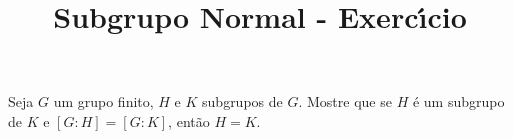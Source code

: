 \documentclass{beamer}
\title{Subgrupo Normal - Exerc{\'\i}cio}
\author[\autor]{\autor}
\institute[\instituto]{\instituto}
\begin{document}


    \begin{frame}
        \begin{exercicio}
            Seja $G$ um grupo finito, $H$ e $K$ subgrupos de $G$. Mostre que se $H$ é um subgrupo de $K$ e $[G : H ] = [G : K]$, então $H = K$.
        \end{exercicio}
    \end{frame}
\end{document}
